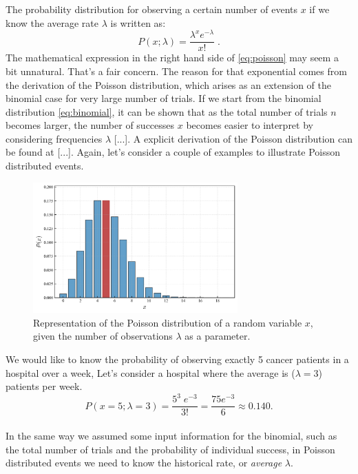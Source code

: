 \documentclass{book}
\begin{document}
The probability distribution for observing a certain number of events $x$ if we know the average rate $\lambda$ is written as:
\begin{equation}
    P(x; \lambda) = \frac{\lambda^x e^{-\lambda}}{x!} \; .
    \label{eq:poisson}
\end{equation}
The mathematical expression in the right hand side of \eqref{eq:poisson} may seem a bit unnatural. That's a fair concern. The reason for that exponential comes from the derivation of the Poisson distribution, which arises as an extension of the binomial case for very large number of trials. If we start from the binomial distribution \eqref{eq:binomial}, it can be shown that as the total number of trials $n$ becomes larger, the number of successes $x$ becomes easier to interpret by considering frequencies $\lambda$ [...]. A explicit derivation of the Poisson distribution can be found at [...]. Again, let's consider a couple of examples to illustrate Poisson distributed events.

\begin{figure}[ht]
    \centering
    \includegraphics[width=0.7\textwidth]{figures/chapter2/poisson_1.png}
    \caption{Representation of the Poisson distribution of a random variable $x$, given the number of observations $\lambda$ as a parameter.}
    \label{fig:poisson1}
\end{figure}

We would like to know the probability of observing exactly 5 cancer patients in a hospital over a week, Let's consider a hospital where the average is ($\lambda = 3$) patients per week. 
\begin{equation}
    P(x=5; \lambda = 3) = \frac{5^3 \; e^{-3}}{3!} = \frac{75 e^{-3}}{6} \approx 0.140. \nonumber
\end{equation}\\

In the same way we assumed some input information for the binomial, such as the total number of trials and the probability of individual success, in Poisson distributed events we need to know the historical rate, or \textit{average} $\lambda$.
\end{document}
